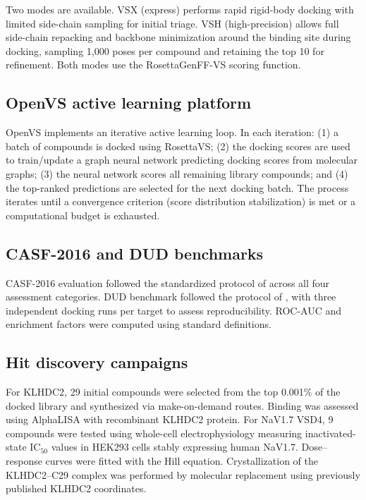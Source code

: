 \documentclass[11pt]{article}
\begin{document}
Two modes are available. VSX (express) performs rapid rigid-body docking with limited side-chain sampling for initial triage. VSH (high-precision) allows full side-chain repacking and backbone minimization around the binding site during docking, sampling 1,000 poses per compound and retaining the top 10 for refinement. Both modes use the RosettaGenFF-VS scoring function.

\subsection{OpenVS active learning platform}

OpenVS implements an iterative active learning loop. In each iteration: (1) a batch of compounds is docked using RosettaVS; (2) the docking scores are used to train/update a graph neural network predicting docking scores from molecular graphs; (3) the neural network scores all remaining library compounds; and (4) the top-ranked predictions are selected for the next docking batch. The process iterates until a convergence criterion (score distribution stabilization) is met or a computational budget is exhausted.

\subsection{CASF-2016 and DUD benchmarks}

CASF-2016 evaluation followed the standardized protocol of \citet{su2020} across all four assessment categories. DUD benchmark followed the protocol of \citet{mysinger2012}, with three independent docking runs per target to assess reproducibility. ROC-AUC and enrichment factors were computed using standard definitions.

\subsection{Hit discovery campaigns}

For KLHDC2, 29 initial compounds were selected from the top 0.001\% of the docked library and synthesized via make-on-demand routes. Binding was assessed using AlphaLISA with recombinant KLHDC2 protein. For NaV1.7 VSD4, 9 compounds were tested using whole-cell electrophysiology measuring inactivated-state IC$_{50}$ values in HEK293 cells stably expressing human NaV1.7. Dose--response curves were fitted with the Hill equation. Crystallization of the KLHDC2--C29 complex was performed by molecular replacement using previously published KLHDC2 coordinates.
\end{document}
